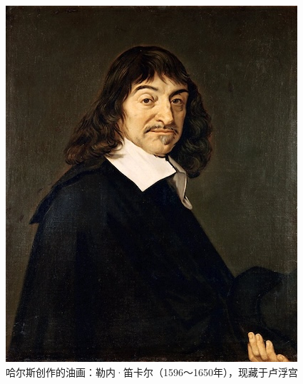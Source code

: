\documentclass[b5paper]{ctexart}
\begin{document}
\begin{figure}[htbp]
 \centering
 \includegraphics[scale=0.4]{img/Descartes}
 \caption{哈尔斯创作的油画：勒内·笛卡尔（1596～1650年），现藏于卢浮宫}
 \label{fig:Decartes}
\end{figure}
\end{document}
